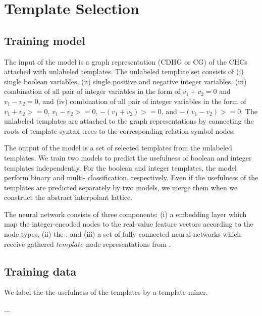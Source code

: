 \section{Template Selection}\label{section:template-selection}



\subsection{Training model}
%
The input of the model is a graph representation (CDHG or CG) of the CHCs attached with unlabeled templates. 
%
The unlabeled template set consists of (i) single boolean variables, (ii) single positive and negative integer variables, (iii) combination of all pair of integer variables in the form of $v_{1} + v_{2} = 0$ and $v_{1} - v_{2} = 0$, and (iv) combination of all pair of integer variables in the form of $v_{1} + v_{2} >= 0$, $v_{1} - v_{2} >= 0$, $-(v_{1} + v_{2}) >= 0$, and $-(v_{1} - v_{2}) >= 0$.
%
The unlabeled templates are attached to the graph representations by connecting the roots of template syntax trees to the corresponding relation symbol nodes.


The output of the model is a set of selected templates from the unlabeled templates.
%
We train two models to predict the usefulness of boolean and integer templates independently. For the boolean and integer templates, the model perform binary and multi- classification, respectively.
%
Even if the usefulness of the templates are predicted separately by two models, we merge them when we construct the abstract interpolant lattice.


The neural network consists of three components: (i) a embedding layer which map the integer-encoded nodes to the real-value feature vectors according to the node types, (ii) the \hyperedgeGNN, and (iii) a set of fully connected neural networks which receive gathered $\textit{template}$ node representations from \hyperedgeGNNs.

\subsection{Training data}
We label the the usefulness of the templates by a template miner. 

...






